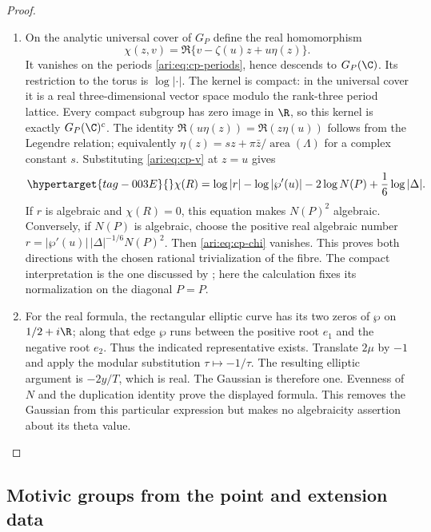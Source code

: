 \begin{proof}
\begin{enumerate}[label=\arabic*.,leftmargin=*]
\item On the analytic universal cover of $G_P$ define the real
homomorphism
\[
 \chi(z,v)=\Re\{v-\zeta(u)z+u\eta(z)\}.
\]
It vanishes on the periods \eqref{ari:eq:cp-periods}, hence descends
to $G_P(\C)$. Its restriction to the torus is $\log|\cdot|$.
The kernel is compact: in the universal cover it is a real
three-dimensional vector space modulo the rank-three period
lattice. Every compact subgroup has zero image in $\R$, so
this kernel is exactly $G_P(\C)^c$.
The identity
$\Re(u\eta(z))=\Re(z\eta(u))$ follows from the Legendre relation;
equivalently $\eta(z)=sz+\pi\bar z/\operatorname{area}(\Lambda)$
for a complex constant $s$. Substituting
\eqref{ari:eq:cp-v} at $z=u$ gives
\begin{equation}\hypertarget{tag-003E}{}\label{ari:eq:cp-chi}
 \chi(R)=\log|r|-\log|\wp'(u)|
            -2\log N(P)+\frac16\log|\Delta|.
\end{equation}
If $r$ is algebraic and $\chi(R)=0$, this equation makes
$N(P)^2$ algebraic. Conversely, if $N(P)$ is algebraic,
choose the positive real algebraic number
$r=|\wp'(u)|\,|\Delta|^{-1/6}N(P)^2$.
Then \eqref{ari:eq:cp-chi} vanishes. This proves both directions
with the chosen rational trivialization of the fibre.
The compact interpretation is the one discussed by
\citet[slides 5--8]{bertrand2017}; here the calculation fixes
its normalization on the diagonal $P=P$.

\item For the real formula, the rectangular elliptic curve has its
two zeros of $\wp$ on $1/2+i\R$; along that edge $\wp$ runs
between the positive root $e_1$ and the negative root $e_2$.
Thus the indicated representative exists. Translate $2\mu$
by $-1$ and apply the modular substitution $\tau\mapsto-1/\tau$.
The resulting elliptic argument is $-2y/T$, which is real.
The Gaussian is therefore one. Evenness of $N$ and the
duplication identity prove the displayed formula. This removes
the Gaussian from this particular expression but makes no
algebraicity assertion about its theta value.
\end{enumerate}
\end{proof}

\subsection{Motivic groups from the point and extension data}


